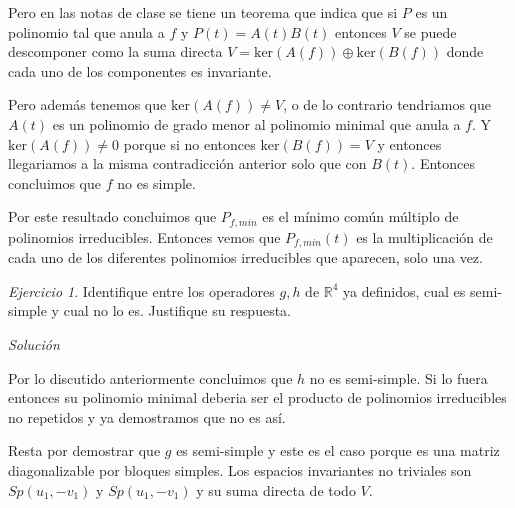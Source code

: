 \documentclass[11pt,a4paper]{article}
\theoremstyle{definition}
\theoremstyle{remark}
\newtheorem{exc}{Ejercicio}
\newcommand{\RR}{\mathbb{R}}
\begin{document}
\begin{enumerate}
	Pero en las notas de clase se tiene un teorema que indica que si $ P $ es un polinomio tal que anula a $ f $ y $ P(t) = A(t)B(t) $ entonces $ V $ se puede descomponer como la suma directa $ V = \text{ker}(A(f)) \oplus \text{ker}(B(f)) $ donde cada uno de los componentes es invariante.
	
	Pero además tenemos que $ \text{ker}(A(f)) \not = V $, o de lo contrario tendriamos que $ A(t) $ es un polinomio de grado menor al polinomio minimal que anula a $ f $. Y $ \text{ker}(A(f)) \not = 0 $ porque si no entonces  $ \text{ker}(B(f)) = V $ y entonces llegariamos a la misma contradicción anterior solo que con $ B(t) $.
	Entonces concluimos que $ f $ no es simple.
	
	Por este resultado concluimos que $ P_{f,min} $ es el mínimo común múltiplo de polinomios irreducibles. Entonces vemos que $ P_{f,min}(t) $ es la multiplicación de cada uno de los diferentes polinomios irreducibles que aparecen, solo una vez.
	\end{enumerate}

\begin{exc}
	Identifique entre los operadores $ g,h $ de $ \RR^4 $ ya definidos, cual es semi-simple y cual no lo es. Justifique su respuesta.
	
\end{exc}

\textit{Solución}

	Por lo discutido anteriormente concluimos que $ h $ no es semi-simple. Si lo fuera entonces su polinomio minimal deberia ser el producto de polinomios irreducibles no repetidos y ya demostramos que no es así.
	
	Resta por demostrar que $ g $ es semi-simple y este es el caso porque es una matriz diagonalizable por bloques simples. Los espacios invariantes no triviales son $ Sp(u_1,-v_1) $ y $ Sp(u_1,-v_1) $ y su suma directa de todo $ V $. 
\end{document}
